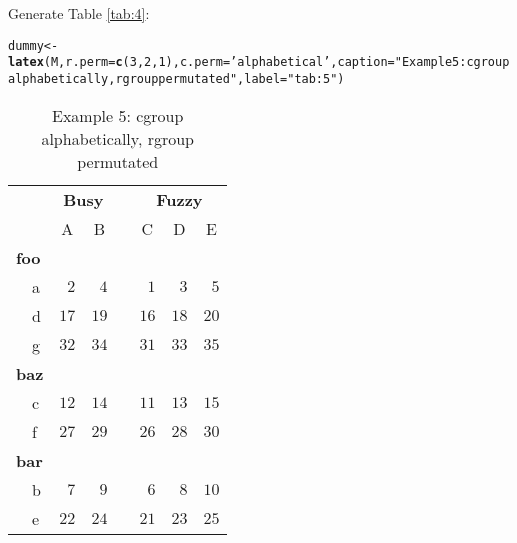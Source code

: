 \documentclass{article}\usepackage[]{graphicx}\usepackage[]{color}
\makeatletter
\newcommand{\hlnum}[1]{\textcolor[rgb]{0.686,0.059,0.569}{#1}}%
\newcommand{\hlstr}[1]{\textcolor[rgb]{0.192,0.494,0.8}{#1}}%
\newcommand{\hlstd}[1]{\textcolor[rgb]{0.345,0.345,0.345}{#1}}%
\newcommand{\hlkwb}[1]{\textcolor[rgb]{0.69,0.353,0.396}{#1}}%
\newcommand{\hlkwc}[1]{\textcolor[rgb]{0.333,0.667,0.333}{#1}}%
\newcommand{\hlkwd}[1]{\textcolor[rgb]{0.737,0.353,0.396}{\textbf{#1}}}%
\newenvironment{kframe}{%
 \def\at@end@of@kframe{}%
 \ifinner\ifhmode%
  \def\at@end@of@kframe{\end{minipage}}%
  \begin{minipage}{\columnwidth}%
 \fi\fi%
 \def\FrameCommand##1{\hskip\@totalleftmargin \hskip-\fboxsep
 \colorbox{shadecolor}{##1}\hskip-\fboxsep
     \hskip-\linewidth \hskip-\@totalleftmargin \hskip\columnwidth}%
 \MakeFramed {\advance\hsize-\width
   \@totalleftmargin\z@ \linewidth\hsize
   \@setminipage}}%
 {\par\unskip\endMakeFramed%
 \at@end@of@kframe}
\makeatother
\begin{document}
Generate Table  \ref{tab:4}:
\begin{kframe}
\begin{alltt}
\hlstd{dummy} \hlkwb{<-} \hlkwd{latex}\hlstd{(M,} \hlkwc{r.perm}\hlstd{=}\hlkwd{c}\hlstd{(}\hlnum{3}\hlstd{,}\hlnum{2}\hlstd{,}\hlnum{1}\hlstd{),} \hlkwc{c.perm}\hlstd{=}\hlstr{'alphabetical'} \hlstd{,} \hlkwc{caption}\hlstd{=}\hlstr{"Example 5: cgroup alphabetically, rgroup permutated"}\hlstd{,} \hlkwc{label}\hlstd{=}\hlstr{"tab:5"}\hlstd{)}
\end{alltt}
\end{kframe}%
\begin{table}[!tbp]
\caption{Example 5: cgroup alphabetically, rgroup permutated\label{tab:5}} 
\begin{center}
\begin{tabular}{lrrcrrr}
\hline\hline
\multicolumn{1}{l}{\bfseries }&\multicolumn{2}{c}{\bfseries Busy}&\multicolumn{1}{c}{\bfseries }&\multicolumn{3}{c}{\bfseries Fuzzy}\tabularnewline
\cline{2-3} \cline{5-7}
\multicolumn{1}{l}{}&\multicolumn{1}{c}{A}&\multicolumn{1}{c}{B}&\multicolumn{1}{c}{}&\multicolumn{1}{c}{C}&\multicolumn{1}{c}{D}&\multicolumn{1}{c}{E}\tabularnewline
\hline
{\bfseries foo}&&&&&&\tabularnewline
~~a&$ 2$&$ 4$&&$ 1$&$ 3$&$ 5$\tabularnewline
~~d&$17$&$19$&&$16$&$18$&$20$\tabularnewline
~~g&$32$&$34$&&$31$&$33$&$35$\tabularnewline
\hline
{\bfseries baz}&&&&&&\tabularnewline
~~c&$12$&$14$&&$11$&$13$&$15$\tabularnewline
~~f&$27$&$29$&&$26$&$28$&$30$\tabularnewline
\hline
{\bfseries bar}&&&&&&\tabularnewline
~~b&$ 7$&$ 9$&&$ 6$&$ 8$&$10$\tabularnewline
~~e&$22$&$24$&&$21$&$23$&$25$\tabularnewline
\hline
\end{tabular}\end{center}

\end{table}
\end{document}
